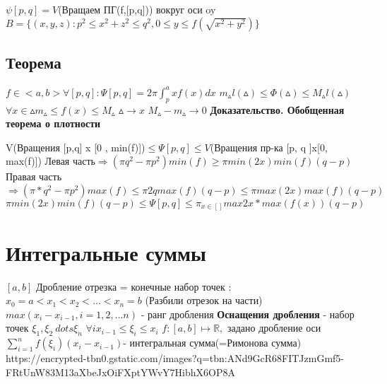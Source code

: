﻿\documentclass[12pt, a4paper]{article}
\newcommand{\nl}{\newline}
\begin{document}
  $  \psi [p,q] = V$(Вращаем ПГ(f,[p,q])) вокруг оси  oy \nl
  $ B = \{(x, y, z) : p^2 \leq x^2 + z^2 \leq q^2, 0\leq y \leq f(\sqrt{x^2 + y^2})\} $ \nl
  \subsection{Теорема}
	$ f \in <a , b> \forall [p,q] : \Psi [p, q] = 2\pi \int_p^a x f(x)dx $ \nl
	$ m_\vartriangle l(\vartriangle) \leq \Phi(\vartriangle) \leq M_\vartriangle l(\vartriangle)   $ \nl
	$ \forall x \in \vartriangle  m_\vartriangle \leq f(x) \leq M_\vartriangle $ \nl
	$  \vartriangle \rightarrow x$    $M_\vartriangle - m_\vartriangle \rightarrow 0 $ \nl
	\textbf{Доказательство. Обобщенная теорема о плотности} \nl

	V(Вращения [p,q] x [0 , min(f)])$  \leq \Psi[p, q] \leq V$(Вращения пр-ка [p, q ]x[0, max(f)]) \nl
	Левая часть$  \Longrightarrow (\pi q^2 - \pi p^2)min(f) \geq \pi min(2x)min(f) (q - p)$    \nl          
	Правая часть $ \Longrightarrow( \pi*q^2 - \pi p^2) max(f) \leq  \pi 2q max(f)(q - p) \leq \pi max(2x)max(f)(q - p) $ \nl
	$\pi min(2x)min(f)(q - p )\leq \Psi[p ,q ] \leq  \pi_{x\in[]}max2x * max(f(x))(q-p)$\nl

\section{Интегральные суммы}
$ [a, b] $ Дробление отрезка  = конечные набор точек : \nl
$ x_0 = a < x_1 < x_2 < \dots < x_n = b $ (Разбили отрезок на части)\nl
$ max(x_i - x_{i - 1}, i = 1,2, \dots n)$ - ранг дробления \nl
\textbf{Оснащения дробления } - набор точек $ \xi_1, \xi_2 \ dots \xi_n $ \nl
$ \forall i x_{i - 1 } \leq \xi_i \leq x_i$ \nl
$ f: [a,b] \mapsto \mathbb{R}, $ задано дробление оси \nl
$ \sum_{i=1}^n f(\xi_i)(x_i -x_{i -1})$- интегральная сумма(=Римонова сумма) \nl
https://encrypted-tbn0.gstatic.com/images?q=tbn:ANd9GcR68FITJzmGmf5-FRtUnW83M13aXbeJxOiFXptYWvY7HibhX6OP8A \nl
\end{document}
